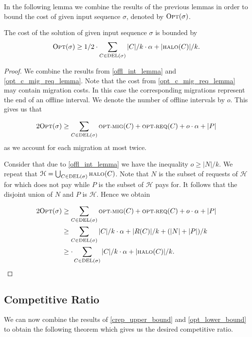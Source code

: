 \documentclass[a4paper,UKenglish,cleveref, autoref, thm-restate,authorcolumns]{lipics-v2019}
\newcommand{\optmig}{\text{\scriptsize OPT-MIG}}
\newcommand{\optreq}{\text{\scriptsize OPT-REQ}}
\newcommand{\del}{\text{\scriptsize DEL}}
\newcommand{\opt}{\text{O{\scriptsize PT}}}
\newcommand{\halo}{\text{\scriptsize HALO}}
\begin{document}
In the following lemma we combine the results of the previous lemmas in order to bound the cost of \opt{} given input sequence $\sigma$, denoted by $\opt(\sigma)$.


\begin{lemma}
	\label{opt_lower_bound}
	The cost of the solution of \opt{} given input sequence $\sigma$ is bounded by
	\begin{align*}
	\opt{}(\sigma)\geq1/2\cdot\sum_{C\in\del{}(\sigma)}|C|/k\cdot\alpha+|\halo(C)|/k.
	\end{align*}
\end{lemma}

\begin{proof}
	We combine the results from \cref{offl_int_lemma} and \cref{opt_c_mig_req_lemma}. Note that the cost from \cref{opt_c_mig_req_lemma} may contain migration costs. In this case the corresponding migrations represent the end of an offline interval. We denote the number of offline intervals by $o$. This gives us that
	
	\begin{align*}
	2\opt{}(\sigma)\geq\sum_{C\in\del(\sigma)}\optmig(C)+\optreq(C)+ o\cdot\alpha+|P|
	\end{align*}
	as we account for each migration at most twice.
	
	Consider that due to \cref{offl_int_lemma} we have the inequality $o\geq|N|/k$. We repeat that $\mathcal{H}=\bigcup_{C\in\del{}(\sigma)}\halo{}(C)$. Note that $N$ is the subset of requests of $\mathcal{H}$ for which \opt{} does not pay while $P$ is the subset of $\mathcal{H}$ \opt{} pays for. It follows that the disjoint union of $N$ and $P$ is $\mathcal{H}$. Hence we obtain
	
	\begin{align*}
	2\opt{}(\sigma)&\geq\sum_{C\in\del(\sigma)}\optmig(C)+\optreq(C)+ o\cdot\alpha+|P|\\
	&\geq\sum_{C\in\del(\sigma)}|C|/k\cdot\alpha+|R(C)|/k+(|N|+|P|)/k\\
	&\geq \cdot\sum_{C\in\del{}(\sigma)}|C|/k\cdot\alpha+|\halo(C)|/k.
	\end{align*}
\end{proof}


\subsection{Competitive Ratio}

We can now combine the results of \cref{crep_upper_bound} and \cref{opt_lower_bound} to obtain the following theorem which gives us the desired competitive ratio.
\end{document}
